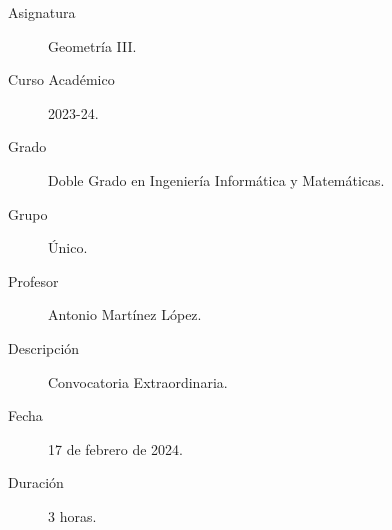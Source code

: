 \documentclass[12pt]{article}
\begin{document}

    
    

    
    \begin{description}
        \item[Asignatura] Geometría III.
        \item[Curso Académico] 2023-24.
        \item[Grado] Doble Grado en Ingeniería Informática y Matemáticas.
        \item[Grupo] Único.
        \item[Profesor] Antonio Martínez López.
        \item[Descripción] Convocatoria Extraordinaria.
        \item[Fecha] 17 de febrero de 2024.
        \item[Duración] 3 horas.
    
    \end{description}
    \newpage
\end{document}
